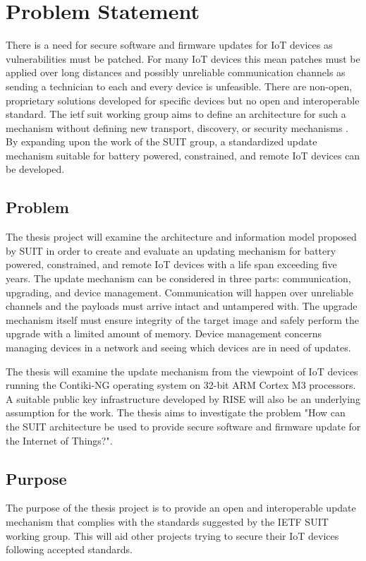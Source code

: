 \documentclass[0-thesis.tex]{subfiles}
\begin{document}
\section{Problem Statement}
There is a need for secure software and firmware updates for IoT devices as
vulnerabilities must be patched. For many IoT devices this mean patches must be applied
over long distances and possibly unreliable communication channels as sending a technician
to each and every device is unfeasible. There are non-open, proprietary solutions
developed for specific devices but no open and interoperable standard. The \gls{ietf}
\gls{suit} working group aims to define an architecture for such a mechanism without
defining new transport, discovery, or security mechanisms \parencite{suit}. By expanding
upon the work of the SUIT group, a standardized update mechanism suitable for battery
powered, constrained, and remote IoT devices can be developed.

\subsection{Problem}
The thesis project will examine the architecture and information model proposed by SUIT in
order to create and evaluate an updating mechanism for battery powered, constrained, and
remote IoT devices with a life span exceeding five years. The update mechanism can be
considered in three parts: communication, upgrading, and device management. Communication
will happen over unreliable channels and the payloads must arrive intact and untampered
with. The upgrade mechanism itself must ensure integrity of the target image and safely
perform the upgrade with a limited amount of memory. Device management concerns managing
devices in a network and seeing which devices are in need of updates.

The thesis will examine the update mechanism from the viewpoint of IoT devices running the
Contiki-NG operating system on 32-bit ARM Cortex M3 processors. A suitable public key
infrastructure developed by RISE will also be an underlying assumption for the work. The
thesis aims to investigate the problem "How can the SUIT architecture be used to provide
secure software and firmware update for the Internet of Things?".

\subsection{Purpose}
The purpose of the thesis project is to provide an open and interoperable update mechanism
that complies with the standards suggested by the IETF SUIT working group. This will aid
other projects trying to secure their IoT devices following accepted standards.
\end{document}
